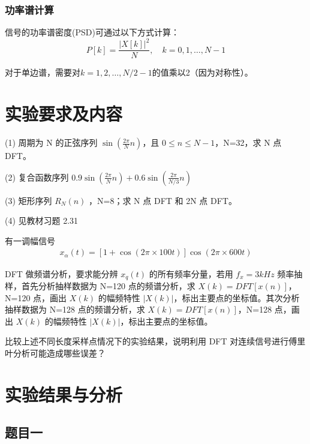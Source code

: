 \documentclass[12pt,hyperref,a4paper,UTF8]{ctexart}
\begin{document}
\subsubsection{功率谱计算}
信号的功率谱密度(PSD)可通过以下方式计算：
\begin{equation}
P[k] = \frac{|X[k]|^2}{N}, \quad k = 0,1,\ldots,N-1
\end{equation}

对于单边谱，需要对$k=1,2,\ldots,N/2-1$的值乘以2（因为对称性）。

\section{实验要求及内容}


(1) 周期为 N 的正弦序列 \(\sin(\frac{2\pi}{N}n)\)，且 \(0\leq n\leq N-1\)，N=32，求 N 点 DFT。

(2) 复合函数序列 \(0.9\sin(\frac{2\pi}{N}n) + 0.6\sin(\frac{2\pi}{N/3}n)\)

(3) 矩形序列 \(R_N(n)\) ，N=8；求 N 点 DFT 和 2N 点 DFT。

(4) 见教材习题 2.31

有一调幅信号
\begin{align*}
x_\alpha(t) = [1 + \cos(2\pi \times 100t)] \cos(2\pi \times 600t)
\end{align*}

DFT  做频谱分析，要求能分辨 \(x_q(t)\) 的所有频率分量，若用 \(f_x = 3kHz\) 频率抽样，首先分析抽样数据为 N=120 点的频谱分析，求 \(X(k) = DFT[x(n)]\)，N=120 点，画出 \(X(k)\) 的幅频特性 \(\left|X(k)\right|\)，标出主要点的坐标值。其次分析抽样数据为 N=128 点的频谱分析，求 \(X(k) = DFT[x(n)]\)，N=128 点，画出 \(X(k)\) 的幅频特性 \(\left|X(k)\right|\)，标出主要点的坐标值。

比较上述不同长度采样点情况下的实验结果，说明利用 DFT 对连续信号进行傅里叶分析可能造成哪些误差？






\section{实验结果与分析}

\subsection{题目一}
\end{document}

